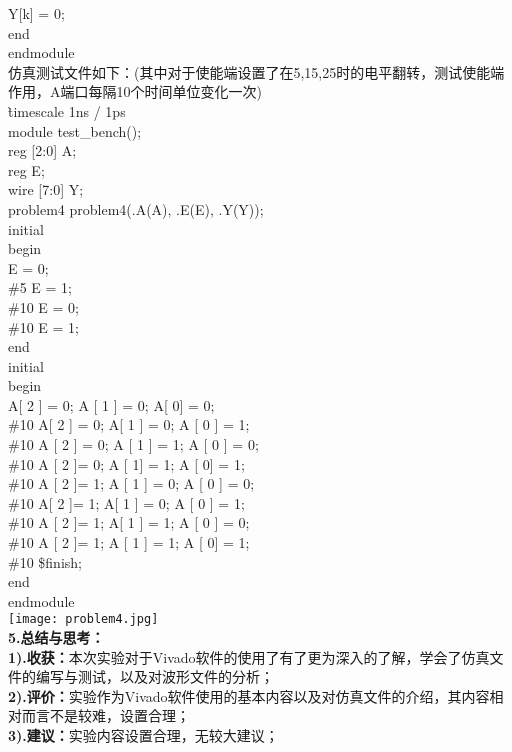 \documentclass[12pt]{ctexart}
\begin{document}
\hspace*{1.5cm}Y[k] = 0;\\
\hspace*{0.5cm}end\\
endmodule\\
仿真测试文件如下：(其中对于使能端设置了在5,15,25时的电平翻转，测试使能端作用，A端口每隔10个时间单位变化一次)\\
\`timescale 1ns / 1ps\\
module test\_bench();\\
reg [2:0] A;\\
reg E;\\
wire [7:0]  Y;\\
problem4 problem4(.A(A), .E(E), .Y(Y));\\
initial\\
begin\\
\hspace*{0.5cm}E = 0;\\
\hspace*{0.5cm}\#5 E = 1;\\
\hspace*{0.5cm}\#10 E = 0;\\
\hspace*{0.5cm}\#10 E = 1;\\
end\\
initial\\
begin\\
\hspace*{0.5cm}A[  2 ]  = 0; A [  1 ] = 0; A[  0]  = 0; \\
\hspace*{0.5cm}\#10  A[  2 ] = 0; A[  1 ] = 0; A [  0 ]  = 1; \\
\hspace*{0.5cm}\#10  A [  2 ] = 0; A [  1 ] = 1; A [  0 ]  = 0; \\
\hspace*{0.5cm}\#10  A [  2 ]= 0; A  [  1] = 1; A [  0]  = 1; \\
\hspace*{0.5cm}\#10  A [  2 ]= 1; A [  1 ]  = 0; A [  0 ]  = 0; \\
\hspace*{0.5cm}\#10  A[  2 ]= 1; A[  1 ]  = 0; A [  0 ]  = 1; \\
\hspace*{0.5cm}\#10  A [  2 ]= 1; A[  1 ]  = 1; A [  0 ]  = 0; \\
\hspace*{0.5cm}\#10  A [  2 ]= 1; A [  1 ]  = 1; A [  0]  = 1; \\
\hspace*{0.5cm}\#10 \$finish;\\
end\\
endmodule\\
\texttt{[image: problem4.jpg]}\\
{\bf5.总结与思考：}\\
{\bf1).收获：}本次实验对于Vivado软件的使用了有了更为深入的了解，学会了仿真文件的编写与测试，以及对波形文件的分析；\\
{\bf2).评价：}实验作为Vivado软件使用的基本内容以及对仿真文件的介绍，其内容相对而言不是较难，设置合理；\\
{\bf3).建议：}实验内容设置合理，无较大建议；
\end{document}
